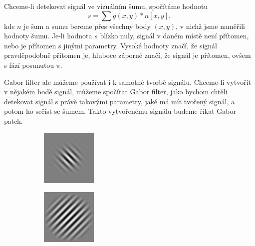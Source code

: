 Chceme-li detekovat signál ve vizuálním šumu, spočítáme hodnotu $$s=\sum
g(x,y)*n[x,y],$$ kde $n$ je šum a sumu bereme přes všechny body $(x,y)$, v
nichž jsme naměřili hodnoty šumu. Je-li hodnota $s$  blízko nuly, signál v
daném místě není přítomen, nebo je přítomen s jinými parametry. Vysoké hodnoty
značí, že
signál pravděpodobně přítomen je, hluboce záporné značí, že signál je přítomen,
ovšem s fází posunutou $\pi$.

Gabor filter ale můžeme používat i k samotné tvorbě signálu. Chceme-li vytvořit
v nějakém bodě signál, můžeme spočítat Gabor filter, jako bychom chtěli
detekovat signál s právě takovými parametry, jaké má mít tvořený signál, a
potom ho sečíst se šumem. Takto vytvořenému signálu budeme říkat Gabor patch.

\begin{figure}[h!]
\begin{subfigure}{0.25\textwidth}
  \centering
  \includegraphics[width=.8\linewidth]{img/gabor1}
\end{subfigure}%
\begin{subfigure}{0.25\textwidth}
  \centering
  \includegraphics[width=.8\linewidth]{img/gabor2}

\end{subfigure}
\end{figure}
